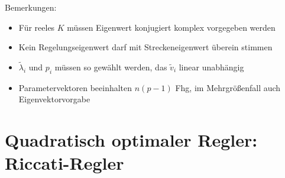Bemerkungen:
\begin{itemize}
    \item Für reeles $K$ müssen Eigenwert konjugiert komplex vorgegeben werden
    \item Kein Regelungseigenwert darf mit Streckeneigenwert überein stimmen
    \item $\tilde{\lambda}_i$ und $p_i$ müssen so gewählt werden, das $\tilde{v}_i$
        linear unabhängig
    \item Parametervektoren beeinhalten $n(p-1)$ Fhg, im Mehrgrößenfall
        auch Eigenvektorvorgabe
\end{itemize}

\section{Quadratisch optimaler Regler: Riccati-Regler}
